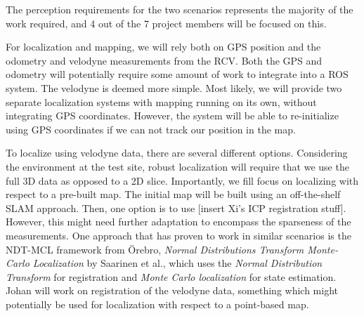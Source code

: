 \documentclass[11pt,a4paper]{article}
\begin{document}
The perception requirements for the two scenarios represents the
majority of the work required, and 4 out of the 7 project members will
be focused on this.

For localization and mapping, we will rely both on GPS position and the
odometry and velodyne measurements from the RCV. Both the GPS and
odometry will potentially require some amount of work to integrate into
a ROS system. The velodyne is deemed more simple. Most likely, we will
provide two separate localization systems with mapping running on its own, without
integrating GPS coordinates. However, the system will be able to re-initialize
using GPS coordinates if we can not track our position in the map.

To localize using velodyne data, there are several different options.
Considering the environment at the test site, robust localization will
require that we use the full 3D data as opposed to a 2D slice.
Importantly, we fill focus on localizing with respect to a pre-built map.
The initial map will be built using an off-the-shelf SLAM approach.
Then, one option is to use [insert Xi's ICP registration stuff]. However, this
might need further adaptation to encompass the sparseness of the measurements.
One approach that has proven to work in similar scenarios is the NDT-MCL
framework from Örebro, \textit{Normal Distributions Transform Monte-Carlo Localization}
by Saarinen et al., which uses the \textit{Normal Distribution
Transform} for registration and \textit{Monte Carlo localization} for state estimation.
Johan will work on registration of the velodyne data, something which might
potentially be used for localization with respect to a point-based map.
\end{document}
